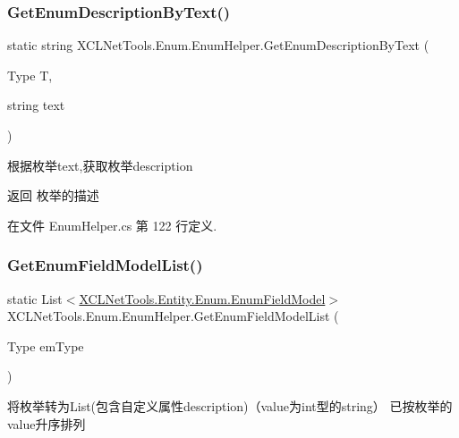 \subsubsection{\texorpdfstring{Get\+Enum\+Description\+By\+Text()}{GetEnumDescriptionByText()}}
{\footnotesize\ttfamily static string X\+C\+L\+Net\+Tools.\+Enum.\+Enum\+Helper.\+Get\+Enum\+Description\+By\+Text (\begin{DoxyParamCaption}\item[{Type}]{T,  }\item[{string}]{text }\end{DoxyParamCaption})\hspace{0.3cm}{\ttfamily [static]}}



根据枚举text,获取枚举description 

\begin{DoxyReturn}{返回}
枚举的描述
\end{DoxyReturn}


在文件 Enum\+Helper.\+cs 第 122 行定义.

\mbox{\label{class_x_c_l_net_tools_1_1_enum_1_1_enum_helper_acdcc3f9200705cc0831c1395f5d2c51e}} 
\subsubsection{\texorpdfstring{Get\+Enum\+Field\+Model\+List()}{GetEnumFieldModelList()}}
{\footnotesize\ttfamily static List$<$\hyperlink{class_x_c_l_net_tools_1_1_entity_1_1_enum_1_1_enum_field_model}{X\+C\+L\+Net\+Tools.\+Entity.\+Enum.\+Enum\+Field\+Model}$>$ X\+C\+L\+Net\+Tools.\+Enum.\+Enum\+Helper.\+Get\+Enum\+Field\+Model\+List (\begin{DoxyParamCaption}\item[{Type}]{em\+Type }\end{DoxyParamCaption})\hspace{0.3cm}{\ttfamily [static]}}



将枚举转为\+List(包含自定义属性description)（value为int型的string） 已按枚举的value升序排列 


